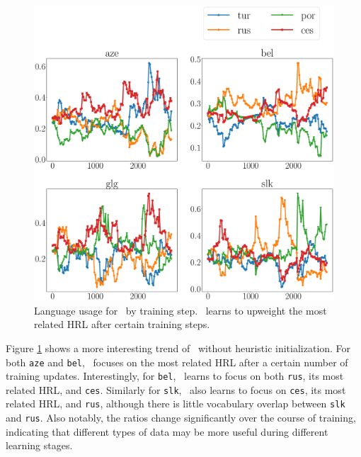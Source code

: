 \begin{figure}
    \centering
    \includegraphics[width=\columnwidth]{figs/uniform_prob_plot.eps}
    \caption{\label{fig:nmt_distrib_uni}Language usage for \dds~by training step. \dds~learns to upweight the most related HRL after certain training steps.}
\end{figure}

Figure \ref{fig:nmt_distrib_uni} shows a more interesting trend of \dds~without heuristic initialization.
For both \texttt{aze} and \texttt{bel}, \dds~focuses on the most related HRL after a certain number of training updates.
Interestingly, for \texttt{bel}, \dds~learns to focus on both \texttt{rus}, its most related HRL, and \texttt{ces}. Similarly for \texttt{slk}, \dds~also learns to focus on \texttt{ces}, its most related HRL, and \texttt{rus}, although there is little vocabulary overlap between \texttt{slk} and \texttt{rus}.
Also notably, the ratios change  significantly over the course of training, indicating that different types of data may be more useful during different learning stages.




